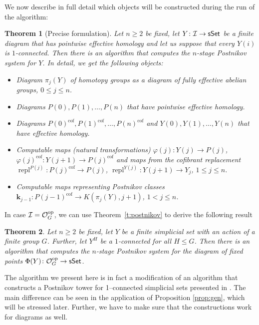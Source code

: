 \documentclass[12pt,a4wide]{article}
\theoremstyle{plain}
\newtheorem{thm}{Theorem}[section]
\theoremstyle{definition}
\newcommand{\cofr}{\mathrm{cof}}
\newcommand{\repl}{\mathop\mathrm{repl}}
\newcommand{\heading}[1]{\vspace{1ex}\par\noindent{\bf\boldmath #1}}
\newcommand{\Ocat}{\mathcal{O}}
\newcommand{\Pst}[1]{P(#1)}
\newcommand{\Pnewst}{\Pst{\then}}
\newcommand{\Yst}[1]{Y(#1)}
\newcommand{\Ynewst}{\Yst{\then}}
\newcommand{\towercompmap}[2]{#1(#2)}
\newcommand{\varphist}[1]{\towercompmap{\varphi}{#1}}
\newcommand{\then}{n}
\newcommand{\thedim}{{n}}
\newcommand{\thedimmm}{{j}}
\renewcommand\:{\colon}
\newcommand{\dY}{Y}
\newcommand{\dpi}{\pi}
\newcommand{\dK}{K}
\newcommand{\icat}{\mathcal I}
\newcommand\kkk{{\mathbf{k}}}
\begin{document}
We now describe in full detail which objects will be constructed during the run of the algorithm:
{\renewcommand{\thethm}{A}\addtocounter{thm}{-1}
\begin{thm}[Precise formulation]\label{t:postnikov-restat}
Let $\thedim\geq 2$ be fixed, let $\dY\:\icat \to \sSet$
be a finite diagram that has pointwise effective homology and let us suppose that every $\dY(i)$ is
$1$-connected. Then there is an algorithm that computes the $n$-stage Postnikov system for $\dY$. In detail, we get the following objects:
\begin{itemize}
\item Diagram $\dpi_\thedimmm(\dY)$ of homotopy groups as a diagram of fully effective abelian groups, $0\leq \thedimmm\le\thedim$.
\item
Diagrams $\Pst{0}, \Pst{1},\ldots,\Pnewst$ that have pointwise effective homology.
\item Diagrams  $\Pst{0}^\cofr, \Pst{1}^\cofr, \ldots,\Pnewst^\cofr$ and $\Yst{0}, \Yst{1},\ldots,\Ynewst$ that have effective homology.
\item Computable maps (natural transformations) $\varphist{\thedimmm} \:\Yst{\thedimmm} \to \Pst{\thedimmm}$, $\varphist{\thedimmm}^\cofr \:\Yst{\thedimmm+1} \to \Pst{\thedimmm}^\cofr$ and maps from the cofibrant replacement $\repl^{\Pst{\thedimmm}}\: \Pst{\thedimmm}^\cofr \to \Pst{\thedimmm}$, $\repl^{\Yst{\thedimmm}} \:\Yst{\thedimmm+1} \to \dY_{\thedimmm}$, $1\leq\thedimmm \le\thedim$.
\item
Computable maps representing Postnikov classes $\kkk_{\thedimmm-1}\:\Pst{\thedimmm-1}^\cofr \to \dK(\dpi_\thedimmm(\dY),\thedimmm+1)$,
$1<\thedimmm\le\thedim$.
\end{itemize}
\end{thm}}

In case $\icat =\Ocat_G^\op$, we can use Theorem~\ref{t:postnikov} to derive the following result
\begin{thm}
Let $\thedim\geq 2$ be fixed, let $Y$ be a finite simplicial set with an action of a finite group $G$. Further, let $Y^H$ be a $1$-connected for all $H\leq G$. Then there is an algorithm that computes the $n$-stage Postnikov system for the diagram of fixed points $\Phi(Y)\:\Ocat_G^\op \to \sSet$.
\end{thm}

\heading{Description of the algorithm}

The algorithm we present here is in fact a modification of an algorithm that constructs a Postnikov tower for 1--connected simplicial sets presented in \cite{polypost}. The main difference can be seen in the application of Proposition \ref{prop:gen}, which will be stressed later. Further, we have to make sure that the constructions work for diagrams as well.
\end{document}
